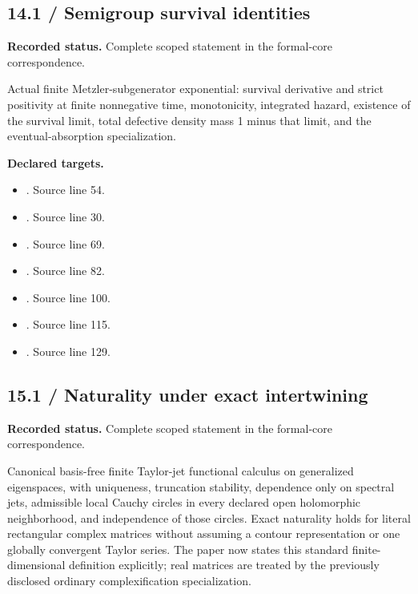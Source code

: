 \subsection{14.1 / Semigroup survival identities}
\label{result:14.1}
\textbf{Recorded status.} Complete scoped statement in the formal-core correspondence.\par
Actual finite Metzler-subgenerator exponential: survival derivative and strict positivity at finite nonnegative time, monotonicity, integrated hazard, existence of the survival limit, total defective density mass 1 minus that limit, and the eventual-absorption specialization.

\textbf{Declared targets.}\begin{itemize}
\item {}. Source line 54.
\item {}. Source line 30.
\item {}. Source line 69.
\item {}. Source line 82.
\item {}. Source line 100.
\item {}. Source line 115.
\item {}. Source line 129.
\end{itemize}
\subsection{15.1 / Naturality under exact intertwining}
\label{result:15.1}
\textbf{Recorded status.} Complete scoped statement in the formal-core correspondence.\par
Canonical basis-free finite Taylor-jet functional calculus on generalized eigenspaces, with uniqueness, truncation stability, dependence only on spectral jets, admissible local Cauchy circles in every declared open holomorphic neighborhood, and independence of those circles. Exact naturality holds for literal rectangular complex matrices without assuming a contour representation or one globally convergent Taylor series. The paper now states this standard finite-dimensional definition explicitly; real matrices are treated by the previously disclosed ordinary complexification specialization.

